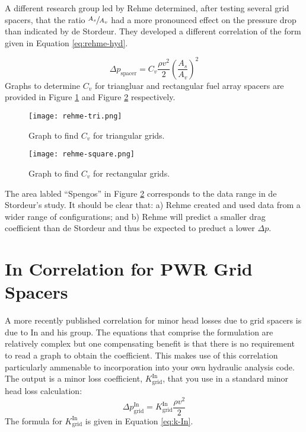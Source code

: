 A different research group led by Rehme determined, after testing several grid spacers, that the ratio $\sfrac{A_s}{A_v}$ had a more pronounced effect on the pressure drop than indicated by de Stordeur.  They developed a different correlation\cite{rehme1973pressure} of the form given in Equation \ref{eq:rehme-hyd}.

\begin{equation}
\Delta p_{\text{spacer}}=C_v \frac{\rho v^2}{2}\left(\frac{A_s}{A_v} \right)^2
\label{eq:rehme-hyd}
\end{equation} 
Graphs to determine $C_v$ for triangluar and rectangular fuel array spacers are provided in Figure \ref{fig:rehme-tri} and Figure \ref{fig:rehme-square} respectively.

\begin{figure}
\texttt{[image: rehme-tri.png]}
\caption{Graph to find $C_v$ for triangular grids.}
\label{fig:rehme-tri}
\end{figure}

\begin{figure}
\texttt{[image: rehme-square.png]}
\caption{Graph to find $C_v$ for rectangular grids.}
\label{fig:rehme-square}
\end{figure}
The area labled ``Spengos'' in Figure \ref{fig:rehme-square} corresponds to the data range in de Stordeur's study.  It should be clear that: a) Rehme created and used data from a wider range of configurations; and b) Rehme will predict a smaller drag coefficient than de Stordeur and thus be expected to preduct a lower $\Delta p$.

\section{In Correlation for PWR Grid Spacers} 
A more recently published correlation\cite{in2002empirical} for minor head losses due to grid spacers is due to In and his group.  The equations that comprise the formulation are relatively complex but one compensating benefit is that there is no requirement to read a graph to obtain the coefficient.  This makes use of this correlation particularly ammenable to incorporation into your own hydraulic analysis code.  The output is a minor loss coefficient, $K_{\text{grid}}^{\text{In}}$, that you use in a standard minor head loss calculation:
$$\Delta p_{\text{grid}}^{\text{In}} = K_{\text{grid}}^{\text{In}}\frac{\rho v^2}{2}$$
The formula for $K_{\text{grid}}^{\text{In}}$ is given in Equation \ref{eq:k-In}.


